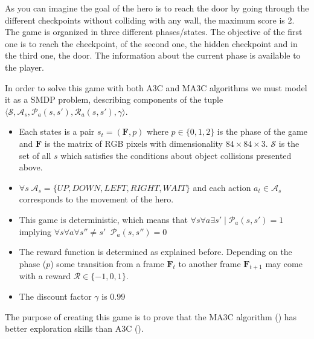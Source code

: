 As you can imagine the goal of the hero is to reach the door by going through the different checkpoints without colliding
with any wall, the maximum score is 2.
The game is organized in three different phases/states.
The objective of the first one is to reach the checkpoint,
of the second one, the hidden checkpoint and in the third one, the door.
The information about the current phase is available
to the player.

In order to solve this game with both \ac{A3C} and \ac{MA3C} algorithms we must model it as a \ac{SMDP} problem,
describing components of the tuple $\langle\mathcal{S}, \mathcal{A}_s, \mathcal{P}_a(s,s'), \mathcal{R}_a(s,s'), \gamma \rangle$.

\begin{itemize}
    \item Each states is a pair $s_t = (\mathbf{F}, p)$ where $p \in \{0,1,2\}$ is the phase of the game and
    $\mathbf{F}$ is the matrix of RGB pixels with dimensionality $84\times84\times3$.
    $\mathcal{S}$ is the set of all $s$ which satisfies the conditions about object collisions presented above.

    \item $\forall s \; \mathcal{A}_s = \{UP, DOWN, LEFT, RIGHT, WAIT\}$ and each action $a_{t}\in \mathcal{A}_s $ corresponds to
    the movement of the hero.

    \item This game is deterministic, which means that $\forall s\forall a\exists s' \; |\; \mathcal{P}_a(s,s') = 1$ implying
    $\forall s\forall a\forall {s''\neq s'} \;\; \mathcal{P}_a(s,s'') = 0$

    \item The reward function is determined as explained before.
    Depending on the phase ($p$) some transition from a frame $\mathbf{F}_t$
    to another frame $\mathbf{F}_{t+1}$ may come with a reward $\mathcal{R} \in \{ -1, 0, 1\}$.

    \item The discount factor $\gamma$ is $0.99$
\end{itemize}

The purpose of creating this game is to prove that the \ac{MA3C} algorithm () has better exploration
skills than A3C ().



